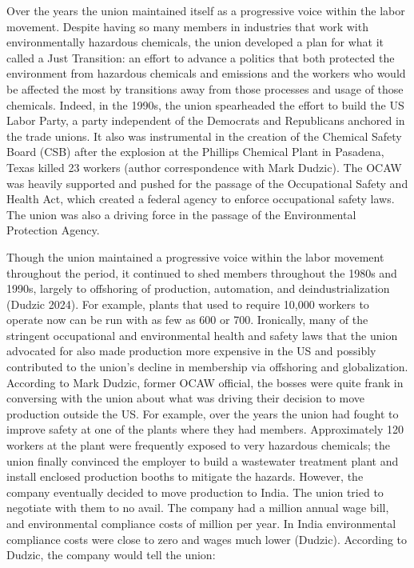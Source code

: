 \documentclass[12pt]{article}
\begin{document}
Over the years the union maintained itself as a progressive voice within the labor movement. Despite having so many members in industries that work with environmentally hazardous chemicals, the union developed a plan for what it called a Just Transition: an effort to advance a politics that both protected the environment from hazardous chemicals and emissions and the workers who would be affected the most by transitions away from those processes and usage of those chemicals. Indeed, in the 1990s, the union  spearheaded the effort to build the US Labor Party, a party independent of the Democrats and Republicans anchored in the trade unions. It also was instrumental in the creation of the Chemical Safety Board (CSB) after the explosion at the Phillips Chemical Plant in Pasadena, Texas killed 23 workers (author correspondence with Mark Dudzic). The OCAW was heavily supported and pushed for the passage of the Occupational Safety and Health Act, which created a federal agency to enforce occupational safety laws. The union was also a driving force in the passage of the Environmental Protection Agency.

Though the union maintained a progressive voice within the labor movement throughout the period, it continued to shed members throughout the 1980s and 1990s, largely to offshoring of production, automation, and deindustrialization (Dudzic 2024). For example, plants that used to require 10,000 workers to operate now can be run with as few as 600 or 700. Ironically, many of the stringent occupational and environmental health and safety laws that the union advocated for also made production more expensive in the US and possibly contributed to the union’s decline in membership via offshoring and globalization. According to Mark Dudzic, former OCAW official, the bosses were quite frank in conversing with the union about what was driving their decision to move production outside the US. For example, over the years the union had fought to improve safety at one of the plants where they had members. Approximately 120 workers at the plant were frequently exposed to very hazardous chemicals; the union finally convinced the employer to build a wastewater treatment plant and install enclosed production booths to mitigate the hazards. However, the company eventually decided to move production to India. The union tried to negotiate with them to no avail. The company had a   million annual wage bill, and environmental compliance costs of   million per year. In India environmental compliance costs were close to zero and wages much lower (Dudzic). According to Dudzic, the company would tell the union:
\end{document}
